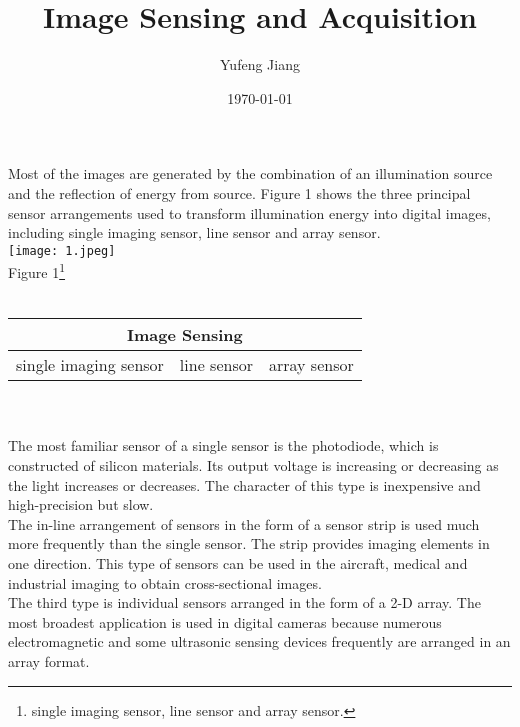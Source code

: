 \documentclass[11pt,oneside,a4paper]{article}
\title{Image Sensing and Acquisition}
\author{Yufeng Jiang}
\date{\today}
\begin{document}
\maketitle
Most of the images are generated by the combination of an illumination source and the reflection of energy from source. Figure 1 shows the three principal sensor arrangements used to transform illumination energy into digital images, including single imaging sensor, line sensor and array sensor. \\
\texttt{[image: 1.jpeg]}\\
Figure 1\footnote{single imaging sensor, line sensor and array sensor.}\\
\\
\begin{tabular}{|c|c|c|}
  \hline
  \multicolumn{3}{|c|}{Image Sensing}\\ \hline
  single imaging sensor & line sensor & array sensor \\ \hline
\end{tabular} \\
\\
\indent The most familiar sensor of a single sensor is the photodiode, which is constructed of silicon materials. Its output voltage is increasing or decreasing as the light increases or decreases. The character of this type is inexpensive and high-precision but slow. \\
\indent The in-line arrangement of sensors in the form of a sensor strip is used much more frequently than the single sensor. The strip provides imaging elements in one direction. This type of sensors can be used in the aircraft, medical and industrial imaging to obtain cross-sectional images. \\
\indent The third type is individual sensors arranged in the form of a 2-D array. The most broadest application is used in digital cameras because numerous electromagnetic and some ultrasonic sensing devices frequently are arranged in an array format.\\
\end{document}
